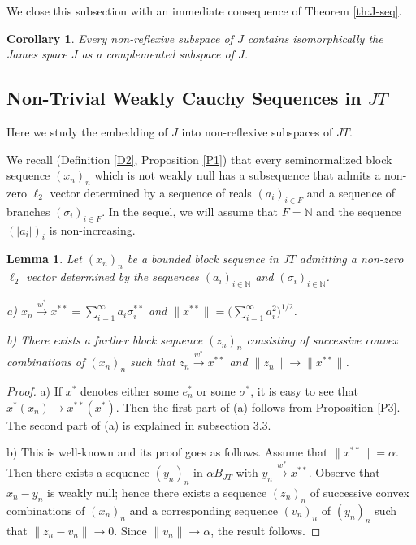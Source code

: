 \documentclass[12pt]{amsart}
\theoremstyle{plain}
\numberwithin{equation}{section}
\newcommand{\N}{\mathbb{N}}
\newcommand{\s}{\sigma}
\newtheorem{lemma}[theorem]{Lemma}
\newtheorem{corollary}[theorem]{Corollary}
\begin{document}
We close this subsection with an immediate consequence of Theorem \ref{th:J-seq}.

\begin{corollary}\label{TH_1}
Every non-reflexive subspace of $J$ contains isomorphically the James space $J$ as a complemented subspace of $J$.
\end{corollary}

\subsection{Non-Trivial Weakly Cauchy Sequences in $JT$}
Here we study the embedding of $J$ into non-reflexive subspaces of $JT$.

We recall (Definition \ref{D2}, Proposition \ref{P1}) that every seminormalized block sequence $(x_n)_n$ which is not weakly null has a subsequence that admits a non-zero $\ell_2$ vector determined by a sequence of reals $(a_i)_{i\in F}$ and a sequence of branches $(\s_i)_{i\in F}$. In the sequel, we will assume that $F = \N$ and the sequence $(|a_i|)_i$ is non-increasing.


\begin{lemma}\label{L7}
Let $(x_n)_n$ be a bounded block sequence in $JT$ admitting a non-zero $\ell_2$ vector determined by the sequences $(a_i)_{i\in \N}$ and $(\s_i)_{i\in \N}$.

a) $x_n \xrightarrow{w^*} x^{**}= \sum_{i=1}^\infty a_i \s_i^{**}$ and $\|x^{**}\| = \big( \sum_{i=1} ^\infty a_i^2\big)^{1/2}$.

b) There exists a further block sequence $(z_n)_n$ consisting of successive convex combinations of $(x_n)_n$ such that $z_n \xrightarrow{w^*} x^{**}$ and $\|z_n\| \to \|x^{**}\|$.
\end{lemma}
\begin{proof}
a) If $x^*$ denotes either some $e_n^*$ or some $\s^*$, it is easy to see that $x^*(x_n) \to x^{**}(x^*)$. Then the first part of (a) follows from Proposition \ref{P3}.
The second part of (a) is explained in subsection 3.3.

b) This is well-known and its proof goes as follows. Assume that $\|x^{**}\| = \alpha$. Then there exists a sequence $(y_n)_n$ in $\alpha B_{JT}$ with $y_n \xrightarrow{w^*} x^{**}$. Observe that $x_n - y_n$ is weakly null; hence there exists a sequence $(z_n)_n$ of successive convex combinations of $(x_n)_n$ and a corresponding sequence $(v_n)_n$ of $(y_n)_n$ such that $\|z_n - v_n\| \to 0$. Since $\|v_n\| \to \alpha$, the result follows.
\end{proof}
\end{document}
